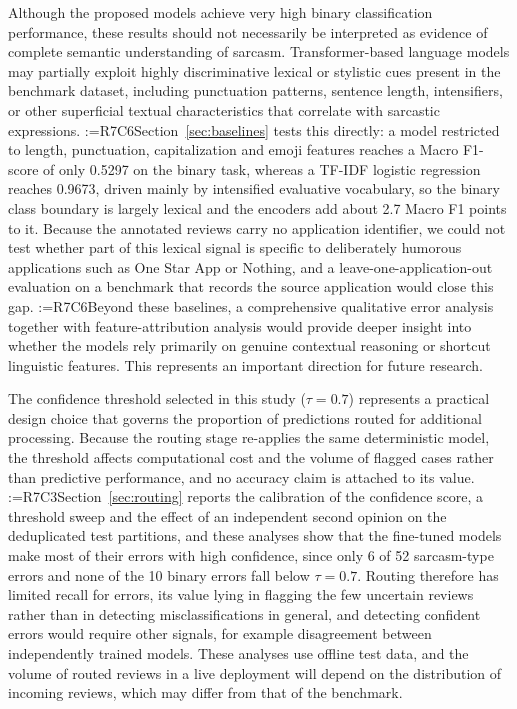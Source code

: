 \documentclass[a4paper,fleqn]{cas-sc}
\makeatletter
\newif\iftracked
\newcommand{\rv@setcolour}[1]{%
  \IfStrEq{#1}{R7C7}{\color{rvEdit}}{%
    \IfSubStr{#1}{R5}{\IfSubStr{#1}{R7}{\color{rvBoth}}{\color{rvFive}}}{\color{rvSeven}}}}
\newcommand{\rv@tag}[1]{\textsuperscript{\sffamily\bfseries\scriptsize[\StrSubstitute{#1}{,}{, }]}\,}
\newcommand{\rv@recordone}[1]{%
  \edef\rv@i{#1}%
  \ifcsdef{rv@n@\rv@i}{}{\csgdef{rv@n@\rv@i}{0}}%
  \csxdef{rv@n@\rv@i}{\the\numexpr\csuse{rv@n@\rv@i}+1\relax}%
  \begingroup\edef\@currentlabel{\rv@i}\label{rv:\rv@i:\csuse{rv@n@\rv@i}}\endgroup}
\newcommand{\rv@record}[1]{\@for\rv@id:=#1\do{\expandafter\rv@recordone\expandafter{\rv@id}}}
\DeclareRobustCommand{\rc}[2]{\rv@record{#1}\iftracked{\rv@setcolour{#1}\rv@tag{#1}#2}\else#2\fi}
\DeclareRobustCommand{\rcrep}[3]{\rv@record{#1}\iftracked{\rv@setcolour{#1}\rv@tag{#1}\rv@strike{#2} #3}\else#3\fi}
\makeatother
\begin{document}
Although the proposed models achieve very high binary classification performance, these results should not necessarily be interpreted as evidence of complete semantic understanding of sarcasm. Transformer-based language models may partially exploit highly discriminative lexical or stylistic cues present in the benchmark dataset, including punctuation patterns, sentence length, intensifiers, or other superficial textual characteristics that correlate with sarcastic expressions. \rc{R7C6}{Section~\ref{sec:baselines} tests this directly: a model restricted to length, punctuation, capitalization and emoji features reaches a Macro F1-score of only 0.5297 on the binary task, whereas a TF-IDF logistic regression reaches 0.9673, driven mainly by intensified evaluative vocabulary, so the binary class boundary is largely lexical and the encoders add about 2.7 Macro F1 points to it. Because the annotated reviews carry no application identifier, we could not test whether part of this lexical signal is specific to deliberately humorous applications such as One Star App or Nothing, and a leave-one-application-out evaluation on a benchmark that records the source application would close this gap.} \rcrep{R7C6}{While the strong performance indicates effective contextual learning,}{Beyond these baselines,} a comprehensive qualitative error analysis together with feature-attribution analysis would provide deeper insight into whether the models rely primarily on genuine contextual reasoning or shortcut linguistic features. This represents an important direction for future research.

The confidence threshold selected in this study ($\tau = 0.7$) represents a practical design choice that governs the proportion of predictions routed for additional processing. Because the routing stage re-applies the same deterministic model, the threshold affects computational cost and the volume of flagged cases rather than predictive performance, and no accuracy claim is attached to its value. \rcrep{R7C3}{A threshold sensitivity analysis computed on the current test partitions was not available at the time of this revision and is identified as an open item.}{Section~\ref{sec:routing} reports the calibration of the confidence score, a threshold sweep and the effect of an independent second opinion on the deduplicated test partitions, and these analyses show that the fine-tuned models make most of their errors with high confidence, since only 6 of 52 sarcasm-type errors and none of the 10 binary errors fall below $\tau = 0.7$. Routing therefore has limited recall for errors, its value lying in flagging the few uncertain reviews rather than in detecting misclassifications in general, and detecting confident errors would require other signals, for example disagreement between independently trained models. These analyses use offline test data, and the volume of routed reviews in a live deployment will depend on the distribution of incoming reviews, which may differ from that of the benchmark.}
\end{document}
